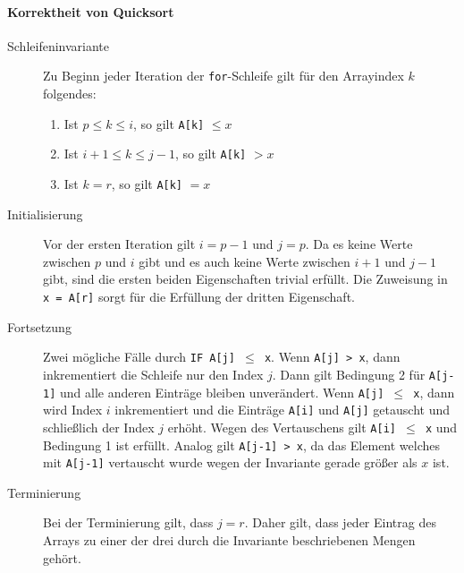 \documentclass[
    ngerman,
    color=3b,
    dark_mode,
    load_common, %
    summary,
    boxarc,
]{rubos-tuda-template}
\begin{document}
\paragraph{Korrektheit von Quicksort}
\begin{description}
    \item [Schleifeninvariante]
          Zu Beginn jeder Iteration der \texttt{for}-Schleife gilt für den Arrayindex $k$ folgendes:
          \begin{enumerate}
              \item Ist $p \leq k \leq i$, so gilt \texttt{A[k]} $\leq x$
              \item Ist $i+1 \leq k \leq j -1$, so gilt \texttt{A[k]} $> x$
              \item Ist $k = r$, so gilt \texttt{A[k]} $= x$
          \end{enumerate}

    \item [Initialisierung]
          Vor der ersten Iteration gilt $i = p - 1$ und $j = p$. Da es keine Werte zwischen $p$ und $i$
          gibt und es auch keine Werte zwischen $i + 1$ und $j - 1$ gibt, sind die ersten beiden Eigenschaften
          trivial erfüllt. Die Zuweisung in \texttt{x = A[r]} sorgt für die Erfüllung der dritten Eigenschaft.
    \item [Fortsetzung]
          Zwei mögliche Fälle durch \texttt{IF A[j] $\leq$ x}. Wenn \texttt{A[j] > x}, dann inkrementiert die
          Schleife nur den Index $j$. Dann gilt Bedingung 2 für \texttt{A[j-1]} und alle anderen Einträge
          bleiben unverändert. Wenn \texttt{A[j] $\leq$ x}, dann wird Index $i$ inkrementiert und die
          Einträge \texttt{A[i]} und \texttt{A[j]} getauscht und schlie\ss{}lich der Index $j$ erhöht. Wegen
          des Vertauschens gilt \texttt{A[i] $\leq$ x} und Bedingung 1 ist erfüllt. Analog gilt
          \texttt{A[j-1] > x}, da das Element welches mit \texttt{A[j-1]} vertauscht wurde wegen der
          Invariante gerade grö\ss{}er als $x$ ist.
    \item [Terminierung]
          Bei der Terminierung gilt, dass $j = r$. Daher gilt, dass jeder Eintrag des Arrays zu einer der drei
          durch die Invariante beschriebenen Mengen gehört.
\end{description}
\end{document}
